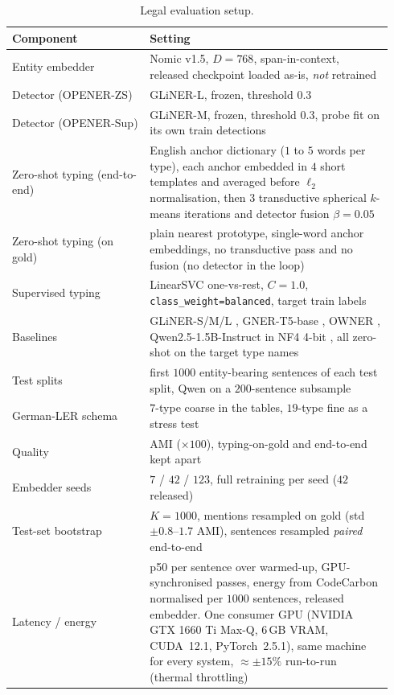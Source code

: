 \begin{table}[H]
\centering
\caption{Legal evaluation setup.}
\label{tab:legal-setup}
\footnotesize
\setlength{\tabcolsep}{3pt}
\begin{threeparttable}
\begin{tabular}{@{}p{0.34\linewidth}p{0.60\linewidth}@{}}
\toprule
Component & Setting \\
\midrule
Entity embedder & Nomic v1.5, $D{=}768$, span-in-context, released checkpoint loaded as-is, \emph{not} retrained \citep{nussbaum2024nomic} \\
Detector (OPENER-ZS) & GLiNER-L, frozen, threshold $0.3$ \citep{zaratiana2024gliner} \\
Detector (OPENER-Sup) & GLiNER-M, frozen, threshold $0.3$, probe fit on its own train detections \\
Zero-shot typing (end-to-end) & English anchor dictionary ($1$ to $5$ words per type), each anchor embedded in $4$ short templates and averaged before $\ell_2$ normalisation, then $3$ transductive spherical $k$-means iterations and detector fusion $\beta{=}0.05$ \\
Zero-shot typing (on gold) & plain nearest prototype, single-word anchor embeddings, no transductive pass and no fusion (no detector in the loop) \\
Supervised typing & LinearSVC one-vs-rest, $C{=}1.0$, \texttt{class\_weight=balanced}, target train labels \citep{fan2008liblinear} \\
\midrule
Baselines & GLiNER-S/M/L \citep{zaratiana2024gliner}, GNER-T5-base \citep{ding2024gner}, OWNER \citep{genest2025owner}, Qwen2.5-1.5B-Instruct \citep{qwen2025} in NF4 4-bit \citep{dettmers2023qlora}, all zero-shot on the target type names \\
Test splits & first $1000$ entity-bearing sentences of each test split, Qwen on a $200$-sentence subsample \\
German-LER schema & $7$-type coarse in the tables, $19$-type fine as a stress test \\
\midrule
Quality & AMI ($\times 100$), typing-on-gold and end-to-end kept apart \\
Embedder seeds & $7$ / $42$ / $123$, full retraining per seed ($42$ released) \\
Test-set bootstrap & $K{=}1000$, mentions resampled on gold (std ${\pm}0.8$--$1.7$ AMI), sentences resampled \emph{paired} end-to-end \\
Latency / energy & p50 per sentence over warmed-up, GPU-synchronised passes, energy from CodeCarbon normalised per $1000$ sentences, released embedder. One consumer GPU (NVIDIA GTX 1660 Ti Max-Q, $6$\,GB VRAM, CUDA~12.1, PyTorch~2.5.1), same machine for every system, ${\approx}{\pm}15\%$ run-to-run (thermal throttling) \\

\end{tabular}
\end{threeparttable}
\end{table}

